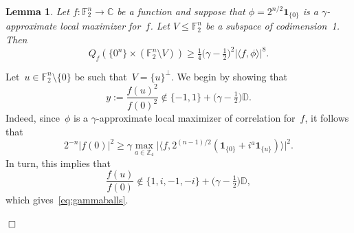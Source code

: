 \documentclass[11pt]{amsart}
\newcommand{\C}{\mathbb{C}} %
\newcommand{\D}{\mathbb{D}} %
\newcommand{\Z}{\mathbb{Z}} %
\newcommand{\F}{\mathbb{F}} %
\newcommand{\one}{\mathbf{1}}
\theoremstyle{plain}
\newtheorem{lemma}[theorem]{Lemma}
\theoremstyle{definition}
\theoremstyle{remark}
\renewenvironment{proof}[1][]{
    	\begin{trivlist}
     	\item[\hspace{\labelsep}{\em\noindent Proof#1:\/}]}
     	{{\hfill$\Box$}
    	\end{trivlist}
  }
\begin{document}
\begin{lemma} \label{lem:terrible}
    Let $f:\F_2^n\to \C$ be a function and suppose that $\phi = 2^{n/2}\one_{\{0\}}$ is a $\gamma$-approximate local maximizer for~$f$.
    Let $V \leq \F_2^n$ be a subspace of codimension~1.
    Then
    \begin{equation*}
        Q_f(\{0^n\}\times (\F_2^n\setminus V)) \geq \tfrac{1}{4} \big(\gamma - \tfrac{1}{2}\big)^2|\langle f, \phi\rangle|^8.
    \end{equation*}
\end{lemma}

\begin{proof}
Let~$u\in \F_2^n\setminus\{0\}$ be such that~$V = \{u\}^\perp$.
  We begin by showing that
  \begin{equation}\label{eq:gammaballs}
      y:= \frac{f(u)^2}{f(0)^2}\not\in \{-1,1\} + \big(\gamma - \tfrac{1}{2}\big)\D.
  \end{equation}
  Indeed, since~$\phi$ is a $\gamma$-approximate local maximizer of correlation for~$f$, it follows that
  \begin{equation*}
      2^{-n}|f(0)|^2 \geq \gamma\max_{a\in \Z_4}\big|\langle f, 2^{(n-1)/2}(\one_{\{0\}} + i^a\one_{\{u\}})\rangle\big|^2.
  \end{equation*}
  In turn, this implies that
  \begin{equation*}
      \frac{f(u)}{f(0)} \not\in \{1,i,-1,-i\} + \big(\gamma - \tfrac{1}{2}\big)\D,
  \end{equation*}
  which gives~\eqref{eq:gammaballs}.


\end{proof}
\end{document}

